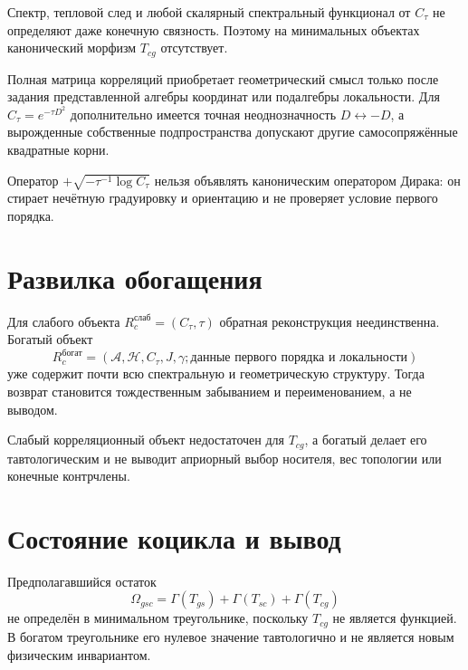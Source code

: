 \begin{theorem}
Спектр, тепловой след и любой скалярный спектральный функционал от
\(C_\tau\) не определяют даже конечную связность. Поэтому на минимальных
объектах канонический морфизм \(T_{cg}\) отсутствует.
\end{theorem}

Полная матрица корреляций приобретает геометрический смысл только после
задания представленной алгебры координат или подалгебры локальности. Для
\(C_\tau=e^{-\tau D^2}\) дополнительно имеется точная неоднозначность
\(D\leftrightarrow-D\), а вырожденные собственные подпространства допускают
другие самосопряжённые квадратные корни.

\begin{nogocriterion}
Оператор \(+\sqrt{-\tau^{-1}\log C_\tau}\) нельзя объявлять каноническим
оператором Дирака: он стирает нечётную градуировку и ориентацию и не
проверяет условие первого порядка.
\end{nogocriterion}

\section{Развилка обогащения}

Для слабого объекта \(R_c^{\text{слаб}}=(C_\tau,\tau)\) обратная реконструкция
неединственна. Богатый объект
\begin{equation}
 R_c^{\text{богат}}=(\mathcal A,\mathcal H,C_\tau,J,\gamma;
 \text{данные первого порядка и локальности})
\end{equation}
уже содержит почти всю спектральную и геометрическую структуру. Тогда
возврат становится тождественным забыванием и переименованием, а не выводом.

\begin{proposition}
Слабый корреляционный объект недостаточен для \(T_{cg}\), а богатый делает
его тавтологическим и не выводит априорный выбор носителя, вес топологии или
конечные контрчлены.
\end{proposition}

\section{Состояние коцикла и вывод}

Предполагавшийся остаток
\begin{equation}
 \Omega_{gsc}=\Gamma(T_{gs})+\Gamma(T_{sc})+\Gamma(T_{cg})
\end{equation}
не определён в минимальном треугольнике, поскольку \(T_{cg}\) не является
функцией. В богатом треугольнике его нулевое значение тавтологично и не
является новым физическим инвариантом.

